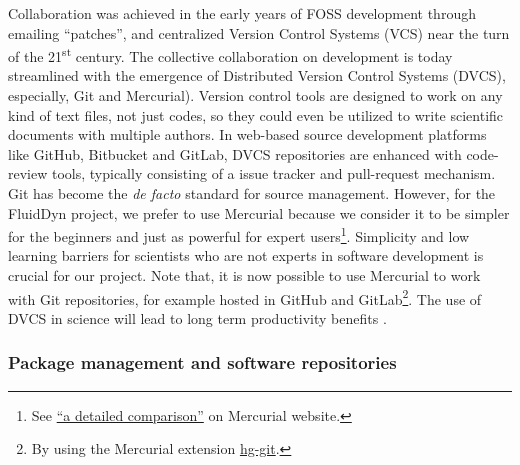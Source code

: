 Collaboration was achieved in the early years of FOSS development through
emailing ``patches'', and centralized Version Control Systems (VCS) near the
turn of the 21\textsuperscript{st} century.  The collective collaboration on
development is today streamlined with the emergence of Distributed Version
Control Systems (DVCS), especially, Git and Mercurial).
%
Version control tools are designed to work on any kind of text files, not just
codes, so they could even be utilized to write scientific documents with
multiple authors.
%
In web-based source development platforms like GitHub, Bitbucket and GitLab,
DVCS repositories are enhanced with code-review tools, typically consisting of
a issue tracker and pull-request mechanism.
%
Git has become the \textit{de facto} standard for source management. However,
for the FluidDyn project, we prefer to use Mercurial because we consider it to
be simpler for the beginners and just as powerful for expert users\footnote{See
  \href{https://www.mercurial-scm.org/wiki/GitConcepts}{``a detailed
comparison''} on Mercurial website.}. Simplicity and low learning barriers for
scientists who are not experts in software development is crucial for our
project.
%
Note that, it is now possible to use Mercurial to work with Git repositories,
for example hosted in GitHub and GitLab\footnote{By using the Mercurial
extension \href{http://hg-git.github.io/}{hg-git}.}.
%
The use of DVCS in science will lead to long term productivity benefits
\citep{wilson_best_2014}.


\subsubsection{Package management and software repositories} 

